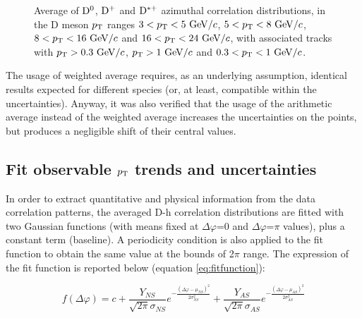 \begin{figure}[!htbp]
 \caption{Average of ${\rm D^0}$, ${\rm D^+}$ and ${\rm D^{*+}}$ azimuthal correlation distributions, in the D meson $p_{\rm T}$ ranges $3<p_{\rm T}<5~\mathrm{GeV}/c$, $5<p_{\rm T}<8~\mathrm{GeV}/c$, $8<p_{\rm T}<16~\mathrm{GeV}/c$ and $16<p_{\rm T}<24~\mathrm{GeV}/c$, with associated tracks with $p_{\rm T}>0.3~\mathrm{GeV}/c$, $p_{\rm T}>1~\mathrm{GeV}/c$ and $0.3 < p_{\rm T} < 1~\mathrm{GeV}/c$.}
 \label{fig:DmesonAverage}
\end{figure}

The usage of weighted average requires, as an underlying assumption, identical results expected for different species (or, at least, compatible within the uncertainties). Anyway, it was also verified that the usage of the arithmetic average instead of the weighted average increases the uncertainties on the points, but produces a negligible shift of their central values.


\subsection{Fit observable $p_{\rm T}$ trends and uncertainties}


In order to extract quantitative and physical information from the data correlation patterns, the averaged D-h correlation distributions are fitted with two Gaussian functions (with means fixed at $\Delta\varphi$=0 and $\Delta\varphi$=$\pi$ values), plus a constant term (baseline). A periodicity condition is also applied to the fit function to obtain the same value at the bounds of 2$\pi$ range. The expression of the fit function is reported below (equation \ref{eq:fitfunction}):

\begin{equation}
f\left(\Delta\varphi\right) = c + \frac{Y_{NS}}{\sqrt{2\pi}\sigma_{NS}}e^{-\frac{\left(\Delta\varphi-\mu_{NS}\right)^{2}}{2\sigma_{NS}^{2}}} + \frac{Y_{AS}}{\sqrt{2\pi}\sigma_{AS}}e^{-\frac{\left(\Delta\varphi-\mu_{AS}\right)^{2}}{2\sigma_{AS}^{2}}}
\label{eq:fitfunction}
\end{equation}

